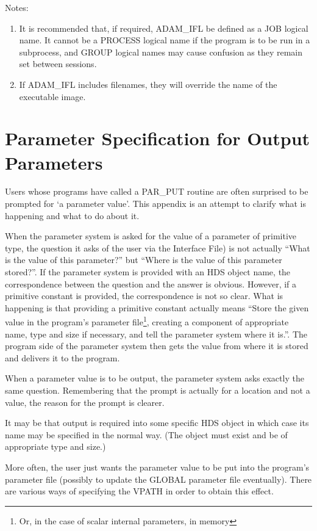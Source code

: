 \documentclass[twoside,11pt,nolof]{starlink}
\begin{document}
Notes:
\begin{enumerate}
\item It is recommended that, if required, ADAM\_IFL be defined as a JOB
logical name.
It cannot be a PROCESS logical name if the program is to be run in a
subprocess, and GROUP logical names may cause confusion as they remain set
between sessions.
\item If ADAM\_IFL includes filenames, they will override the name of the
executable image.
\end{enumerate}

\newpage

\section{Parameter Specification for Output Parameters
\label{output}}

Users whose programs have called a PAR\_PUT routine are often surprised
to be prompted for `a parameter value'.
This appendix is an attempt to clarify what is happening and what to do about
it.

When the parameter system is asked for the value of a parameter of primitive
type, the question it asks of the user via the Interface File) is not
actually ``What is the value of this parameter?'' but ``Where is the value of
this parameter stored?''.
If the parameter system is provided with an HDS object name, the
correspondence between the question and the answer is obvious.
However, if a primitive constant is provided, the correspondence is not so
clear.
What is happening is that providing a primitive constant actually
means ``Store the given value in the program's parameter file\footnote{Or, in
the case of scalar internal parameters, in memory},
creating a component of appropriate name, type and size if necessary, and tell
the parameter system where it is.''.
The program side of the parameter system then gets the value from where it
is stored and delivers it to the program.

When a parameter value is to be output, the parameter system asks exactly the
same question.
Remembering that the prompt is actually for a location and not a value,
the reason for the prompt is clearer.

It may be that output is required into some specific HDS object in which case
its name may be specified in the normal way.
(The object must exist and be of appropriate type and size.)

More often, the user just wants the parameter value to be put into the
program's parameter file (possibly to update the GLOBAL parameter file
eventually).
There are various ways of specifying the VPATH in order to obtain this effect.
\end{document}
